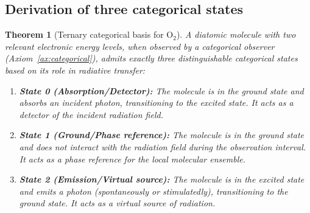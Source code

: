 \documentclass[11pt,twocolumn,a4paper]{article}
\newtheorem{theorem}{Theorem}
\begin{document}
\subsection{Derivation of three categorical states}

\begin{theorem}[Ternary categorical basis for O$_2$]\label{thm:ternary}
A diatomic molecule with two relevant electronic energy levels, when observed by a categorical observer (Axiom~\ref{ax:categorical}), admits exactly three distinguishable categorical states based on its role in radiative transfer:
\begin{enumerate}[label=(\roman*)]
\item \textbf{State 0 (Absorption/Detector):} The molecule is in the ground state and absorbs an incident photon, transitioning to the excited state. It acts as a \emph{detector} of the incident radiation field.
\item \textbf{State 1 (Ground/Phase reference):} The molecule is in the ground state and does not interact with the radiation field during the observation interval. It acts as a \emph{phase reference} for the local molecular ensemble.
\item \textbf{State 2 (Emission/Virtual source):} The molecule is in the excited state and emits a photon (spontaneously or stimulatedly), transitioning to the ground state. It acts as a \emph{virtual source} of radiation.
\end{enumerate}
\end{theorem}
\end{document}
